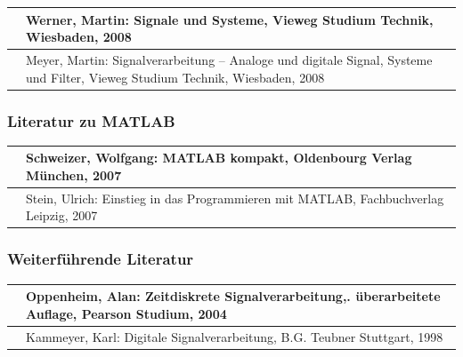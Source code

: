 \begin{tabular}{|p{0.6in}|p{5.7in}|} \hline 
[Wern08] & Werner, Martin: Signale und Systeme,\newline
Vieweg Studium Technik, Wiesbaden, 2008 \\ \hline 
[Meye08] & Meyer, Martin: Signalverarbeitung -- Analoge und digitale Signal, Systeme und Filter,\newline
Vieweg Studium Technik, Wiesbaden, 2008 \\ \hline 
\end{tabular}


\subsubsection{Literatur zu MATLAB}

\begin{tabular}{|p{0.6in}|p{5.7in}|} \hline 
[Schw07] & Schweizer, Wolfgang: MATLAB kompakt,\newline
Oldenbourg Verlag M\"{u}nchen, 2007 \\ \hline 
[Stei07] & Stein, Ulrich: Einstieg in das Programmieren mit MATLAB,\newline
Fachbuchverlag Leipzig, 2007 \\ \hline 
\end{tabular}


\subsubsection{Weiterf\"{u}hrende Literatur}

\begin{tabular}{|p{0.6in}|p{5.7in}|} \hline 
[Oppe04] & Oppenheim, Alan: Zeitdiskrete Signalverarbeitung,\newline
2. \"{u}berarbeitete Auflage, Pearson Studium, 2004 \\ \hline 
[Kamm98] & Kammeyer, Karl: Digitale Signalverarbeitung,\newline
B.G. Teubner Stuttgart, 1998 \\ \hline 
\end{tabular}
